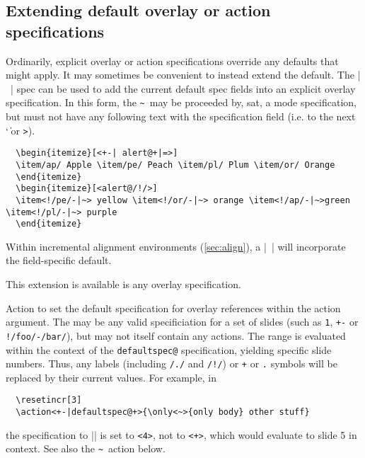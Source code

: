 \documentclass[a4paper]{ltxdoc}
\makeatletter
\def\textpipe{\char`\|}
\def\pdfindxcmd#1#2@{\belowpdfbookmark{\textbackslash\stripcommand#1}{\stripcommand#1}}%
\def\pdfindxcmdalt#1#2{\belowpdfbookmark{#1}{#2}}%
\let\oldcommand\command
\def\command#1{\pdfindxcmd#1@\oldcommand{#1}}
\newenvironment{commandalt}{\@ifnextchar[{\@commandalt}{\@commandalt@noopt}}{\endcommand}
\def\@commandalt[#1]{\@ifnextchar[{\@commandalt@twoopt[#1]}{\@commandalt@oneopt[#1]}}
\def\@commandalt@noopt#1{\pdfindxcmdalt{#1}{#1}\oldcommand{#1}}
\def\@commandalt@oneopt[#1]#2{\pdfindxcmdalt{#1}{#1}\oldcommand{#2}}
\def\@commandalt@twoopt[#1][#2]#3{\pdfindxcmdalt{#1}{#2}\oldcommand{#3}}
\def\cmdcontd#1{\textcolor{red}{\texttt{#1}}}
\makeatother
\begin{document}
\subsection{Extending default overlay or action specifications} \label{sec:actions:~}
    
\begin{commandalt}[<\textasciitilde>][tilde]{{<$\cdots$\textpipe\textasciitilde\textpipe$\cdots$>}}
Ordinarily, explicit overlay or action specifications override any defaults that
might apply.  It may sometimes be convenient to instead extend the default.  The
|~| spec can be used to add the current default spec fields into an explicit
overlay specification.  In this form, the \texttt\textasciitilde\ may be
proceeded by, sat, a mode specification, but must not have any following text
with the specification field (i.e. to the next \texttt\textpipe\ or \texttt>).
\example
\begin{verbatim}
  \begin{itemize}[<+-| alert@+|=>]
  \item/ap/ Apple \item/pe/ Peach \item/pl/ Plum \item/or/ Orange
  \end{itemize}
  \begin{itemize}[<alert@/!/>]
  \item<!/pe/-|~> yellow \item<!/or/-|~> orange \item<!/ap/-|~>green \item<!/pl/-|~> purple
  \end{itemize}
\end{verbatim}
Within incremental alignment environments (\cref{sec:align}), a |~| will
incorporate the field-specific default.

This extension is available is any overlay specification.
\end{commandalt}

\begin{commandalt}[<defaultspec@>][defaultspec]{{<defaultspec@}\meta{increment
      range}\cmdcontd{>}}

  Action to set the default specification for overlay references within the
  action argument.  The  may be any valid specificiation
  for a set of slides (such as \texttt{1}, \texttt{+-} or
  \texttt{!/foo/-/bar/}), but may not itself contain any actions.  The range is
  evaluated within the context of the \texttt{defaultspec@} specification,
  yielding specific slide numbers.  Thus, any labels (including \texttt{/./} and
  \texttt{/!/}) or \texttt+ or \texttt. symbols will be replaced by their
  current values.  For example, in
\begin{verbatim}
  \resetincr[3]
  \action<+-|defaultspec@+>{\only<~>{only body} other stuff}
\end{verbatim}
  the specification to |\only| is set to \texttt{<4>}, not to \texttt{<+>},
  which would evaluate to slide 5 in context.  See also the
  \texttt\textasciitilde\ action below.
\end{commandalt}
\end{document}
